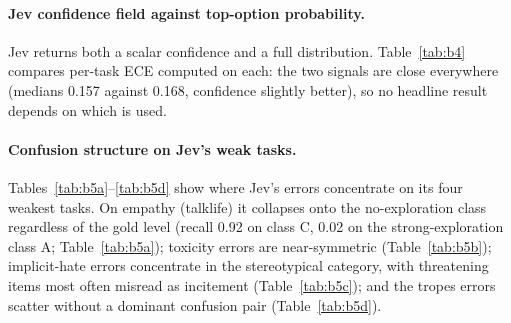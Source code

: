 \documentclass[11pt]{article}
\begin{document}
\paragraph{Jev confidence field against top-option probability.}
Jev returns both a scalar confidence and a full distribution. Table~\ref{tab:b4} compares per-task ECE computed on each: the two signals are close everywhere (medians 0.157 against 0.168, confidence slightly better), so no headline result depends on which is used.

\begin{table}[!htbp]
\centering
\caption{Per-task ECE of Jev's scalar confidence field against the probability of its chosen option.}
\label{tab:b4}
\small

\end{table}

\paragraph{Confusion structure on Jev's weak tasks.}
Tables~\ref{tab:b5a}--\ref{tab:b5d} show where Jev's errors concentrate on its four weakest tasks. On empathy (talklife) it collapses onto the no-exploration class regardless of the gold level (recall 0.92 on class C, 0.02 on the strong-exploration class A; Table~\ref{tab:b5a}); toxicity errors are near-symmetric (Table~\ref{tab:b5b}); implicit-hate errors concentrate in the stereotypical category, with threatening items most often misread as incitement (Table~\ref{tab:b5c}); and the tropes errors scatter without a dominant confusion pair (Table~\ref{tab:b5d}).

\begin{table}[!htbp]
\centering
\caption{Jev confusion matrix on the empathy task (A = strong exploration, B = weak, C = none).}
\label{tab:b5a}
\small

\end{table}

\begin{table}[!htbp]
\centering
\caption{Jev confusion matrix on toxicity prediction.}
\label{tab:b5b}
\small

\end{table}

\begin{table}[!htbp]
\centering
\caption{Jev confusion matrix on implicit hate (pilot task).}
\label{tab:b5c}
\small
\resizebox{\columnwidth}{!}{}
\end{table}
\end{document}
